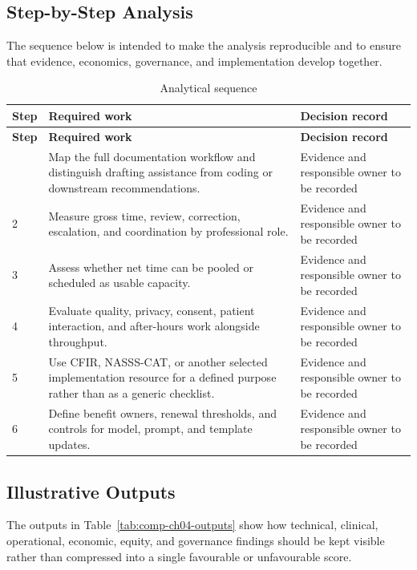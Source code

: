 \subsection{Step-by-Step Analysis}
The sequence below is intended to make the analysis reproducible and to ensure
that evidence, economics, governance, and implementation develop together.

\begin{longtable}{@{}p{}p{}p{}@{}}
\caption{Analytical sequence}
\label{tab:comp-ch04-analysis-steps}\\
\toprule
\textbf{Step} & \textbf{Required work} & \textbf{Decision record} \\
\midrule
\endfirsthead
\toprule
\textbf{Step} & \textbf{Required work} & \textbf{Decision record} \\
\midrule
\endhead
\bottomrule
\endlastfoot
1 & Map the full documentation workflow and distinguish drafting assistance from coding or downstream recommendations. & Evidence and responsible owner to be recorded \\
2 & Measure gross time, review, correction, escalation, and coordination by professional role. & Evidence and responsible owner to be recorded \\
3 & Assess whether net time can be pooled or scheduled as usable capacity. & Evidence and responsible owner to be recorded \\
4 & Evaluate quality, privacy, consent, patient interaction, and after-hours work alongside throughput. & Evidence and responsible owner to be recorded \\
5 & Use CFIR, NASSS-CAT, or another selected implementation resource for a defined purpose rather than as a generic checklist. & Evidence and responsible owner to be recorded \\
6 & Define benefit owners, renewal thresholds, and controls for model, prompt, and template updates. & Evidence and responsible owner to be recorded \\
\end{longtable}

\subsection{Illustrative Outputs}
The outputs in Table~\ref{tab:comp-ch04-outputs} show how technical,
clinical, operational, economic, equity, and governance findings should be kept
visible rather than compressed into a single favourable or unfavourable score.

